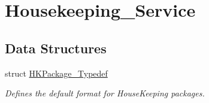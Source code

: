 \hypertarget{group___housekeeping___service}{}\section{Housekeeping\+\_\+\+Service}
\label{group___housekeeping___service}
\subsection*{Data Structures}
\begin{DoxyCompactItemize}
\item 
struct \hyperlink{struct_h_k_package___typedef}{H\+K\+Package\+\_\+\+Typedef}
\begin{DoxyCompactList}\small\item\em Defines the default format for House\+Keeping packages. \end{DoxyCompactList}\end{DoxyCompactItemize}
